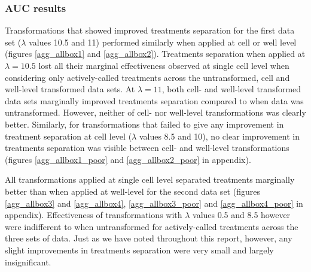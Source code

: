 \documentclass[11pt]{article}
\begin{document}
\subsubsection{AUC results}
\par{Transformations that showed improved treatments separation for the first data set ($\lambda$ values 10.5 and 11) performed similarly when applied at cell or well level (figures \ref{agg_allbox1} and \ref{agg_allbox2}). Treatments separation when applied at $\lambda = 10.5$ lost all their marginal effectiveness observed at single cell level when considering only actively-called treatments across the untransformed, cell and well-level transformed data sets. At $\lambda = 11$, both cell- and well-level transformed data sets marginally improved treatments separation compared to when data was untransformed. However, neither of cell- nor well-level transformations was clearly better. Similarly, for transformations that failed to give any improvement in treatment separation at cell level ($\lambda$ values 8.5 and 10), no clear improvement in treatments separation was visible between cell- and well-level transformations (figures \ref{agg_allbox1_poor} and \ref{agg_allbox2_poor} in appendix).}
\par{All transformations applied at single cell level separated treatments marginally better than when applied at well-level for the second data set (figures \ref{agg_allbox3} and \ref{agg_allbox4}, \ref{agg_allbox3_poor} and \ref{agg_allbox4_poor} in appendix). Effectiveness of transformations with $\lambda$ values 0.5 and 8.5 however were indifferent to when untransformed for actively-called treatments across the three sets of data. Just as we have noted throughout this report, however, any slight improvements in treatments separation were very small and largely insignificant.}
\end{document}
